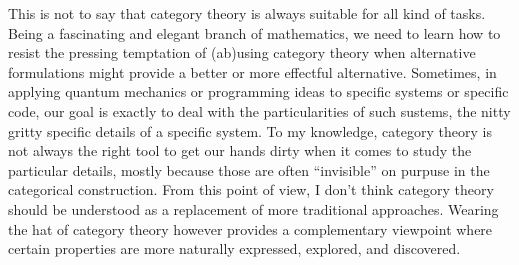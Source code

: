 This is not to say that category theory is always suitable for all kind of tasks. Being a fascinating and elegant branch of mathematics, we need to learn how to resist the pressing temptation of (ab)using category theory when alternative formulations might provide a better or more effectful alternative.  Sometimes, in applying quantum mechanics or programming ideas to specific systems or specific code, our goal is exactly to deal with the particularities of such sustems, the nitty gritty specific details of a specific system. To my knowledge, category theory is not always the right tool to get our hands dirty when it comes to study the particular details, mostly because those are often ``invisible'' on purpuse in the categorical construction. From this point of view, I don't think category theory should be understood as a replacement of more traditional approaches. Wearing the hat of category theory however provides a complementary viewpoint where certain properties are more naturally expressed, explored, and discovered. 

\smallskip

\noindent\textsw{\myLocation, \myTime}


\begin{flushright}
        \myName
\end{flushright}

